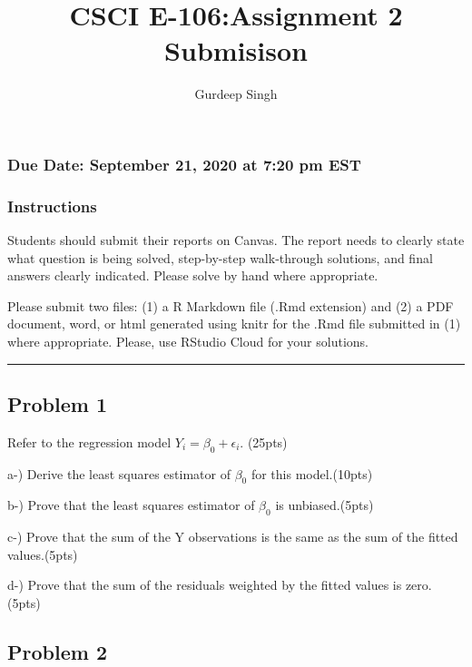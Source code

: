 \documentclass[]{article}
\title{CSCI E-106:Assignment 2 Submisison}
\author{Gurdeep Singh}
\date{}
\begin{document}
\maketitle

\hypertarget{due-date-september-21-2020-at-720-pm-est}{%
\subsubsection{Due Date: September 21, 2020 at 7:20 pm
EST}\label{due-date-september-21-2020-at-720-pm-est}}

\hypertarget{instructions}{%
\subsubsection{Instructions}\label{instructions}}

Students should submit their reports on Canvas. The report needs to
clearly state what question is being solved, step-by-step walk-through
solutions, and final answers clearly indicated. Please solve by hand
where appropriate.

Please submit two files: (1) a R Markdown file (.Rmd extension) and (2)
a PDF document, word, or html generated using knitr for the .Rmd file
submitted in (1) where appropriate. Please, use RStudio Cloud for your
solutions.

\begin{center}\rule{0.5\linewidth}{0.5pt}\end{center}

\hypertarget{problem-1}{%
\subsection{Problem 1}\label{problem-1}}

Refer to the regression model \(Y_{i} = \beta_{0} + \epsilon_{i}\).
(25pts)

a-) Derive the least squares estimator of \(\beta_{0}\) for this
model.(10pts)

b-) Prove that the least squares estimator of \(\beta_{0}\) is
unbiased.(5pts)

c-) Prove that the sum of the Y observations is the same as the sum of
the fitted values.(5pts)

d-) Prove that the sum of the residuals weighted by the fitted values is
zero.(5pts)

\hypertarget{problem-2}{%
\subsection{Problem 2}\label{problem-2}}
\end{document}
